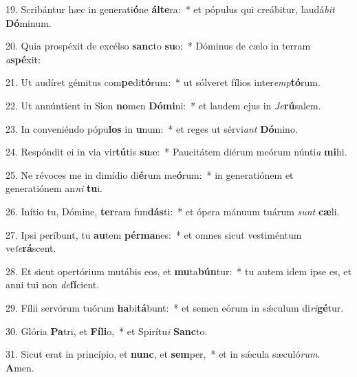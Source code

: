 19. Scribántur hæc in generati\textbf{ó}ne \textbf{ál}\textbf{te}ra:~*  et pópulus qui creábitur, laudá\textit{bit} \textbf{Dó}minum.\

20. Quia prospéxit de excélso \textbf{sanc}to \textbf{su}o:~*  Dóminus de cælo in terram \textit{a}\textbf{spé}xit:\

21. Ut audíret gémitus com\textbf{pe}di\textbf{tó}rum:~*  ut sólveret fílios inter\textit{emp}\textbf{tó}rum.\

22. Ut annúntient in Sion \textbf{no}men \textbf{Dó}\textbf{mi}ni:~*  et laudem ejus in \textit{Je}\textbf{rú}salem.\

23. In conveniéndo pópu\textbf{los} in \textbf{u}num:~*  et reges ut sérvi\textit{ant} \textbf{Dó}mino.\

24. Respóndit ei in via vir\textbf{tú}tis \textbf{su}æ:~*  Paucitátem diérum meórum núnti\textit{a} \textbf{mi}hi.\

25. Ne révoces me in dimídio di\textbf{é}rum me\textbf{ó}rum:~*  in generatiónem et generatiónem an\textit{ni} \textbf{tu}i.\

26. Inítio tu, Dómine, \textbf{ter}ram fun\textbf{dás}ti:~*  et ópera mánuum tuárum \textit{sunt} \textbf{cæ}li.\

27. Ipsi períbunt, tu \textbf{au}tem \textbf{pér}\textbf{ma}nes:~*  et omnes sicut vestiméntum ve\textit{te}\textbf{rá}scent.\

28. Et sicut opertórium mutábis eos, et \textbf{mu}ta\textbf{bún}tur:~*  tu autem idem ipse es, et anni tui non \textit{de}\textbf{fí}cient.\

29. Fílii servórum tuórum \textbf{ha}bi\textbf{tá}bunt:~*  et semen eórum in sǽculum di\textit{ri}\textbf{gé}tur.\

30. Glória \textbf{Pa}tri, et \textbf{Fí}\textbf{li}o,~*  et Spirítu\textit{i} \textbf{Sanc}to.\

31. Sicut erat in princípio, et \textbf{nunc}, et \textbf{sem}per,~*  et in sǽcula sæculó\textit{rum}. \textbf{A}men.\

